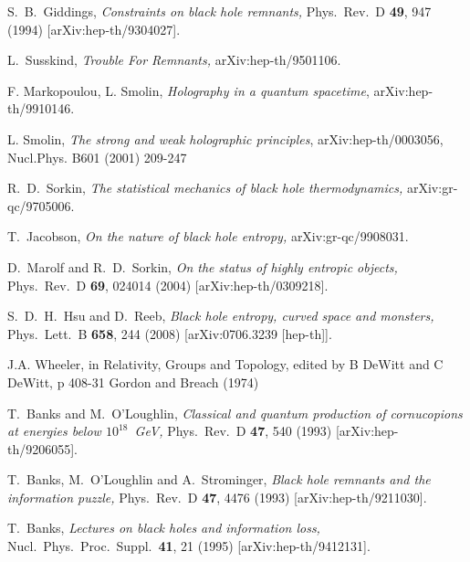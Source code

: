 \documentclass[12pt]{article}
\begin{document}
\begin{thebibliography}{99}
S.~B.~Giddings, {\it Constraints on black hole remnants,} 
Phys.\ Rev.\ D {\bf 49}, 947 (1994) [arXiv:hep-th/9304027]. %

 L.~Susskind, {\it Trouble For Remnants,} 
arXiv:hep-th/9501106. %

F. Markopoulou, L. Smolin, {\it Holography in a quantum spacetime},  arXiv:hep-th/9910146.


L. Smolin, {\it The strong and weak holographic principles}, arXiv:hep-th/0003056, Nucl.Phys. B601 (2001) 209-247 

R.~D.~Sorkin, {\it The statistical mechanics of black hole thermodynamics,}
arXiv:gr-qc/9705006. %


T.~Jacobson, {\it On the nature of black hole entropy,} 
arXiv:gr-qc/9908031. %

D.~Marolf and R.~D.~Sorkin, 
{\it On the status of highly entropic objects,} 
Phys.\ Rev.\ D {\bf 69}, 024014 (2004) [arXiv:hep-th/0309218]. %


S.~D.~H.~Hsu and D.~Reeb, 
{\it Black hole entropy, curved space and monsters,} 
Phys.\ Lett.\ B {\bf 658}, 244 (2008) [arXiv:0706.3239 [hep-th]]. %

J.A. Wheeler, in
Relativity, Groups and Topology,
edited by B DeWitt and C DeWitt,
p 408-31
Gordon and Breach (1974)





  T.~Banks and M.~O'Loughlin, 
{\it Classical and quantum production of cornucopions at energies below $10^18$~GeV,} 
Phys.\ Rev.\ D {\bf 47}, 540 (1993) [arXiv:hep-th/9206055]. %

  T.~Banks, M.~O'Loughlin and A.~Strominger, 
{\it Black hole remnants and the information puzzle,} 
Phys.\ Rev.\ D {\bf 47}, 4476 (1993) [arXiv:hep-th/9211030]. %


 T.~Banks, {\it Lectures on black holes and information loss,} 
Nucl.\ Phys.\ Proc.\ Suppl.\ {\bf 41}, 21 (1995) [arXiv:hep-th/9412131]. %


\end{thebibliography}
\end{document}
